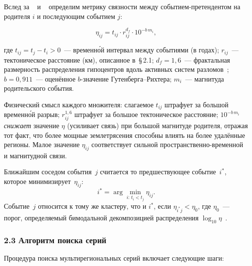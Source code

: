 \documentclass[12pt,a4paper]{article}
\begin{document}
Вслед за \citeauthor{Baiesi2004}~\cite{Baiesi2004} и
\citeauthor{ZaliapinBenZion2008}~\cite{ZaliapinBenZion2008}
определим метрику связности между событием-претендентом на родителя $i$
и последующим событием $j$:

\begin{equation}
  \eta_{ij} = t_{ij} \cdot r_{ij}^{d_f} \cdot 10^{-b\,m_i},
  \label{eq:eta}
\end{equation}

\noindent
где
$t_{ij} = t_j - t_i > 0$~--- временн\'{о}й интервал между событиями (в годах);
$r_{ij}$~--- тектоническое расстояние (км), описанное в~§\,2.1;
$d_f = 1{,}6$~--- фрактальная размерность распределения гипоцентров
вдоль активных систем разломов~\cite{Kagan1991,ZaliapinBenZion2013};
$b = 0{,}911$~--- оценённое $b$-значение Гутенберга--Рихтера;
$m_i$~--- магнитуда родительского события.

Физический смысл каждого множителя: слагаемое $t_{ij}$ штрафует за большой
временн\'{о}й разрыв; $r_{ij}^{1{,}6}$ штрафует за большое тектоническое
расстояние; $10^{-b\,m_i}$ \textit{снижает} значение $\eta$ (усиливает связь)
при большой магнитуде родителя, отражая тот факт, что более мощные землетрясения
способны влиять на более удалённые регионы. Малое значение $\eta_{ij}$
соответствует сильной пространственно-временной и магнитудной связи.

Ближайшим соседом события~$j$ считается то предшествующее событие~$i^*$,
которое минимизирует~$\eta_{ij}$:
\[
  i^* = \arg\min_{i:\,t_i < t_j} \eta_{ij}.
\]
Событие~$j$ относится к тому же кластеру, что и $i^*$, если
$\eta_{i^*j} < \eta_0$, где $\eta_0$~--- порог, определяемый бимодальной
декомпозицией распределения $\log_{10}\eta$~\cite{ZaliapinBenZion2013}.

\subsubsection*{2.3 Алгоритм поиска серий}

Процедура поиска мультирегиональных серий включает следующие шаги:
\end{document}
